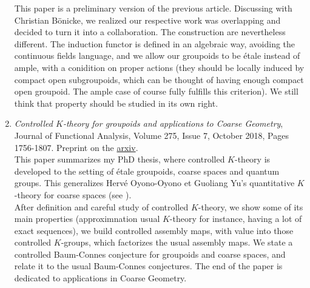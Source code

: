 \documentclass[a4paper]{article}
\begin{document}
\begin{enumerate}
This paper is a preliminary version of the previous article. Discussing with Christian B\"onicke, we realized our respective work was overlapping and decided to turn it into a collaboration. The construction are nevertheless different.  The induction functor is defined in an algebraic way, avoiding the continuous fields language, and we allow our groupoids to be \'etale instead of ample, with a conidition on proper actions (they should be locally induced by compact open subgroupoids, which can be thought of having enough compact open groupoid. The ample case of course fully fulfills this criterion). We still think that property should be studied in its own right.


\item \textit{Controlled $K$-theory for groupoids and applications to Coarse Geometry}, Journal of Functional Analysis, Volume 275, Issue 7, October 2018, Pages 1756-1807. Preprint on the \href{https://arxiv.org/abs/1710.06099}{arxiv}. \\

This paper summarizes my PhD thesis, where controlled $K$-theory is developed to the setting of \'etale groupoids, coarse spaces and quantum groups. This generalizes Herv\'e Oyono-Oyono et Guoliang Yu's quantitative $K$-theory for coarse spaces (see \cite{OY1}\cite{OY2}\cite{OY3}\cite{oyono2019quantitative}). \\

After definition and careful study of controlled $K$-theory, we show some of its main properties (approximnation usual $K$-theory for instance, having a lot of exact sequences), we build controlled assembly maps, with value into those controlled $K$-groups, which factorizes the usual assembly maps. We state a controlled Baum-Connes conjecture for groupoids and coarse spaces, and relate it to the usual Baum-Connes conjectures. The end of the paper is dedicated to applications in Coarse Geometry.                                                                                                                                           
\end{enumerate}



 
\end{document}
